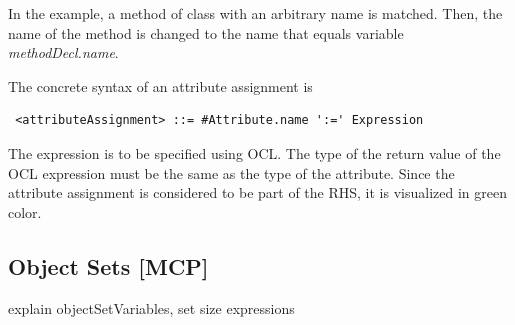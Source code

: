 In the example, a method of class  with an arbitrary name is matched. Then, the name of the method is changed to the name that equals variable \emph{methodDecl.name}. 

The concrete syntax of an attribute assignment is
\begin{lstlisting}
 <attributeAssignment> ::= #Attribute.name ':=' Expression
\end{lstlisting}
The expression is to be specified using OCL. The type of the return value of the OCL expression must be the same as the type of the attribute. Since the attribute assignment is considered to be part of the RHS, it is visualized in green color.

\ext  %
{
\subsection{Object Sets [MCP]}
\label{sec:StoryPatterns:objectsets}

explain objectSetVariables, set size expressions



}
